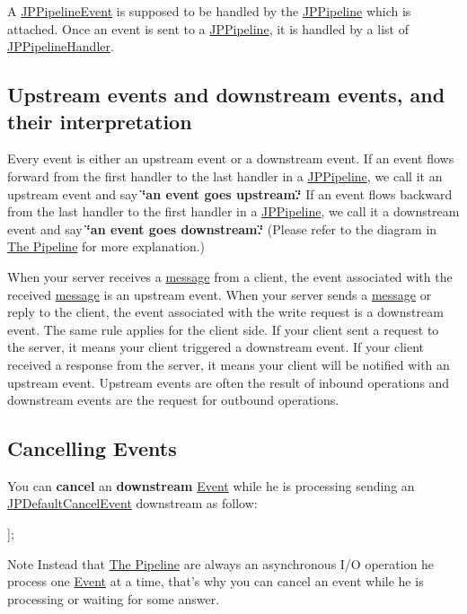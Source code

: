 A \hyperlink{a00023}{JPPipelineEvent} is supposed to be handled by the \hyperlink{a00019}{JPPipeline} which is attached. Once an event is sent to a \hyperlink{a00019}{JPPipeline}, it is handled by a list of \hyperlink{a00029}{JPPipelineHandler}.

\subsection*{Upstream events and downstream events, and their interpretation}

Every event is either an upstream event or a downstream event. If an event flows forward from the first handler to the last handler in a \hyperlink{a00019}{JPPipeline}, we call it an upstream event and say {\bfseries \char`\"{}an
  event goes upstream.\char`\"{}} If an event flows backward from the last handler to the first handler in a \hyperlink{a00019}{JPPipeline}, we call it a downstream event and say {\bfseries \char`\"{}an event goes downstream.\char`\"{}} (Please refer to the diagram in \hyperlink{a00001}{The Pipeline} for more explanation.) 

When your server receives a \hyperlink{a00006}{message} from a client, the event associated with the received \hyperlink{a00006}{message} is an upstream event. When your server sends a \hyperlink{a00006}{message} or reply to the client, the event associated with the write request is a downstream event. The same rule applies for the client side. If your client sent a request to the server, it means your client triggered a downstream event. If your client received a response from the server, it means your client will be notified with an upstream event. Upstream events are often the result of inbound operations and downstream events are the request for outbound operations.

\subsection*{Cancelling Events}

You can {\bfseries cancel} an {\bfseries downstream} \hyperlink{a00005}{Event} while he is processing sending an \hyperlink{a00010}{JPDefaultCancelEvent} downstream as follow: 
\begin{DoxyCode}
 [pipeline sendDownstream:[JPDefaultCancelEvent init]];
\end{DoxyCode}
 \begin{DoxyNote}{Note}
Instead that \hyperlink{a00001}{The Pipeline} are always an asynchronous I/O operation he process one \hyperlink{a00005}{Event} at a time, that's why you can cancel an event while he is processing or waiting for some answer. 
\end{DoxyNote}


